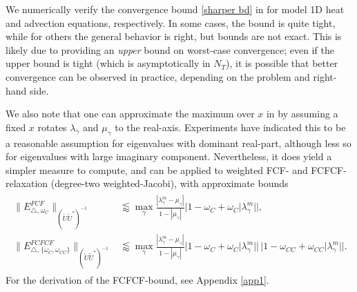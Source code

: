 \documentclass[VANCOUVER,STIX1COL]{WileyNJD-v2}
\begin{document}
We numerically verify the convergence bound \eqref{sharper bd} in 
for model 1D heat and advection equations, respectively. In some cases, the bound is quite tight,
while for others the general behavior is right, but bounds are not exact. This is likely due to
 providing an \emph{upper} bound on worst-case convergence; even if the upper
bound is tight (which  is asymptotically in $N_T$), it is possible that better
convergence can be observed in practice, depending on the problem and right-hand side.


\begin{remark}
We also note that one can approximate the maximum over $x$ in  by assuming
a fixed $x$ rotates $\lambda_\gamma$ and $\mu_\gamma$ to the real-axis. Experiments have indicated this to be a reasonable assumption for eigenvalues with dominant
real-part, although less so for eigenvalues with large imaginary component. Nevertheless,
it does yield a simpler measure to compute, and can be applied to weighted FCF- and
FCFCF-relaxation (degree-two weighted-Jacobi), with approximate bounds
\begin{align} \label{bd FCFCF-relaxation}
\begin{split}
\|E_{\triangle, \hspace{1pt} \omega_C}^{FCF}\|_{(\widetilde{U}\widetilde{U}^*)^{-1}} & \lessapprox
\max_\gamma \frac{|\lambda_\gamma^m - \mu_\gamma|}{1 - |\mu_\gamma|}
|1-\omega_C + \omega_C|\lambda_\gamma^m||\textbf{}, \\
\|{E}_{\triangle, \hspace{1pt} \{\omega_C,\omega_{CC}\}}^{FCFCF}\|_{(\widetilde{U}\widetilde{U}^*)^{-1}} &\lessapprox
\max_\gamma \frac{|\lambda_\gamma^m - \mu_\gamma|}{1 - |\mu_\gamma|}
|1-\omega_C + \omega_C|\lambda_\gamma^m||\, |1-\omega_{CC} + \omega_{CC}|\lambda_\gamma^m||.
\end{split}
\end{align}
For the derivation of the FCFCF-bound, see Appendix \ref{app1}.
\end{remark}
\end{document}
